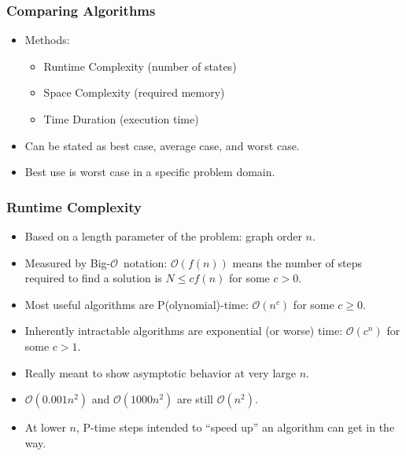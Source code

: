 \documentclass{beamer}
\newcommand{\BO}{\mathcal{O}}
\newcommand{\BigO}{Big-\(\mathcal{O}\)}
\begin{document}
\begin{frame}
  \frametitle{Comparing Algorithms}
  \begin{itemize}
  \item Methods:
    \begin{itemize}
    \item Runtime Complexity (number of states)
    \item Space Complexity (required memory)
    \item Time Duration (execution time)
    \end{itemize}
  \item Can be stated as best case, average case, and worst case.
  \item Best use is worst case in a specific problem domain.
  \end{itemize}
\end{frame}

\begin{frame}
  \frametitle{Runtime Complexity}
  \begin{itemize}
  \item Based on a length parameter of the problem: graph order \(n\).
  \item Measured by \BigO\ notation: \(\BO(f(n))\) means the number of steps required to find a solution is
    \(N\le cf(n)\) for some \(c>0\).
  \item Most useful algorithms are P(olynomial)-time: \(\BO(n^c)\) for some \(c\ge0\).
  \item Inherently intractable algorithms are exponential (or worse) time: \(\BO(c^n)\) for some \(c>1\).
  \item Really meant to show asymptotic behavior at very large \(n\).
  \item \(\BO(0.001n^2)\) and \(\BO(1000n^2)\) are still \(\BO(n^2)\).
  \item At lower \(n\), P-time steps intended to ``speed up'' an algorithm can get in the way.
  \end{itemize}
\end{frame}
\end{document}

